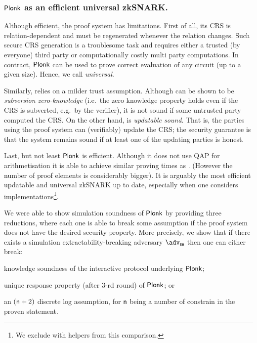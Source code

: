 \documentclass[runningheads,10pt]{llncs}
\begin{document}
    \subsubsection*{$\textnormal{\textsf{Plonk}}$ as an efficient universal zkSNARK.}
    Although efficient, the \groth{} proof system has limitations. First of all,
  its CRS is relation-dependent and must be regenerated whenever the relation
  changes. Such secure CRS generation is a troublesome task and requires
  either a trusted (by everyone) third party or computationally costly multi
  party computations.  In contract, $\textnormal{\textsf{Plonk}}$ can be used to prove correct evaluation
  of any circuit (up to a given size). Hence, we call \plonk{} \emph{universal}.

    Similarly, \plonk{} relies on a milder trust assumption.
    Although \groth{} can be shown to be \emph{subversion zero-knowledge} (i.e.~the zero knowledge property holds even if the CRS is subverted, e.g.~by the verifier), it is not sound if some untrusted party computed the CRS.
    On the other hand, \plonk{} is \emph{updatable sound}. That is, the parties using the proof system can (verifiably) update the CRS; the security guarantee is that the system remains sound if at least one of the updating parties is honest.

    Last, but not least $\textnormal{\textsf{Plonk}}$ is efficient. Although it does not use QAP for arithmetisation it is able to achieve similar proving times as \groth{}. (However the number of proof elements is considerably bigger).
    It is arguably the most efficient updatable and universal zkSNARK up to date,
  especially when one considers implementations\footnote{We exclude \sonic{} with helpers
  from this comparison.}.

    We were able to show simulation soundness of $\textnormal{\textsf{Plonk}}$ by providing three reductions, where each one is able to break some assumption if the proof system does not have the desired security property.
    More precisely, we show that if there exists a simulation extractability-breaking adversary $\advse$ then one can either break:
    \begin{compactenum}
        \item \label{it:ks} knowledge soundness of the interactive protocol underlying $\textnormal{\textsf{Plonk}}$;
        \item \label{it:dlog} unique response property (after $3$-rd round) of $\textnormal{\textsf{Plonk}}$; or
        \item \label{it:ur} an $(\mathsf{n} + 2)$ discrete log assumption, for $\mathsf{n}$ being a number of constrain in the proven statement.
    \end{compactenum}
\end{document}
